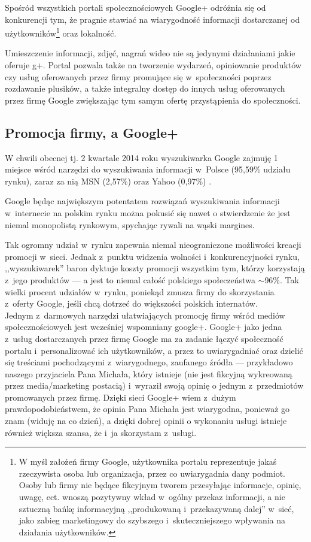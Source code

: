 Spośród wszystkich portali społecznościowych Google+ odróżnia się od konkurencji tym, że pragnie stawiać na wiarygodność informacji dostarczanej od użytkowników\footnote{W myśl założeń firmy Google, użytkownika portalu reprezentuje jakaś rzeczywista osoba lub organizacja, przez co uwiarygadnia dany podmiot. Osoby lub firmy nie będące fikcyjnym tworem przesyłając informacje, opinię, uwagę, ect. wnoszą pozytywny wkład w~ogólny przekaz informacji, a nie sztuczną bańkę informacyjną ,,produkowaną i~przekazywaną dalej'' w~sieć, jako zabieg marketingowy do szybszego i~skuteczniejszego wpływania na działania użytkowników.} oraz lokalność.

Umieszczenie informacji, zdjęć, nagrań wideo nie są jedynymi działaniami jakie oferuje g+. Portal pozwala także na tworzenie wydarzeń, opiniowanie produktów czy usług oferowanych przez firmy promujące się w~społeczności poprzez rozdawanie plusików, a także integralny dostęp do innych usług oferowanych przez firmę Google zwiększając tym samym ofertę przystąpienia do społeczności.


\subsection{Promocja firmy, a Google+}
W chwili obecnej tj. 2 kwartale 2014 roku wyszukiwarka Google zajmuję 1 miejsce wśród narzędzi do wyszukiwania informacji w~Polsce (95,59\% udziału rynku), zaraz za nią MSN (2,57\%) oraz Yahoo (0,97\%) \cite{url:gemius-ranking-silnikow-wyszukiwarek}.

Google będąc największym potentatem rozwiązań wyszukiwania informacji w~internecie na polskim rynku można pokusić się nawet o stwierdzenie że jest niemal monopolistą rynkowym, spychając rywali na wąski margines.

Tak ogromny udział w~rynku zapewnia niemal nieograniczone możliwości kreacji promocji w~sieci. Jednak z~punktu widzenia wolności i~konkurencyjności rynku, ,,wyszukiwarek'' baron dyktuje koszty promocji wszystkim tym, którzy korzystają z~jego produktów --- a jest to niemal całość polskiego społeczeństwa $\sim$96\%. Tak wielki procent udziałów w~rynku, poniekąd zmusza firmy do skorzystania z~oferty Google, jeśli chcą dotrzeć do większości polskich internatów. \\


Jednym z~darmowych narzędzi ułatwiających promocję firmy wśród mediów społecznościowych jest wcześniej wspomniany google+. Google+ jako jedna z~usług dostarczanych przez firmę Google ma za zadanie łączyć społeczność portalu i~personalizować ich użytkowników, a przez to uwiarygadniać oraz dzielić się treściami pochodzącymi z~wiarygodnego, zaufanego źródła --- przykładowo naszego przyjaciela Pana Michała, który istnieje (nie jest fikcyjną wykreowaną przez media/marketing postacią) i~wyraził swoją opinię o jednym z~przedmiotów promowanych przez firmę. Dzięki sieci Google+ wiem z~dużym prawdopodobieństwem, że opinia Pana Michała jest wiarygodna, ponieważ go znam (widuję na co dzień), a dzięki dobrej opinii o wykonaniu usługi istnieje również większa szansa, że i~ja skorzystam z~usługi.\\

